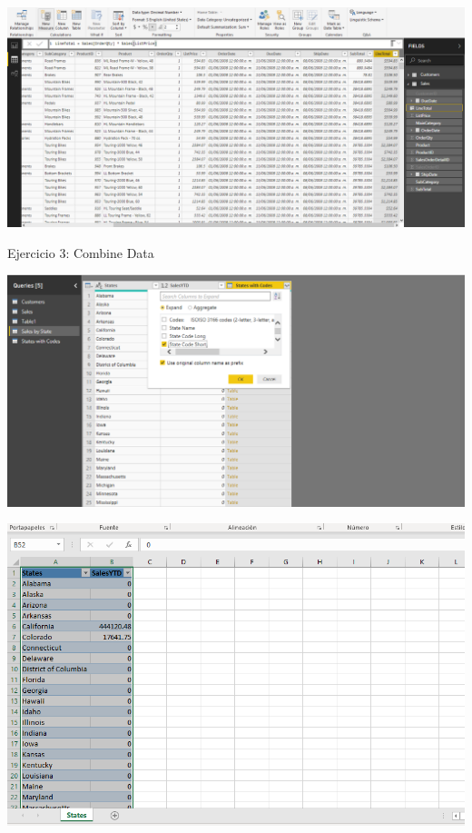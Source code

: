 	\begin{center}
	\includegraphics[width=15cm]{./Imagenes/EJER1T2(8)}
	\end{center}	
Ejercicio 3: Combine Data\\
	\begin{center}
	\includegraphics[width=15cm]{./Imagenes/EJER1T3(1)}
	\end{center}	

	\begin{center}
	\includegraphics[width=15cm]{./Imagenes/EJER1T3(2)}
	\end{center}	

